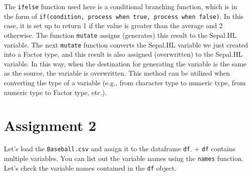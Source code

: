\documentclass[
  a4paper,
]{book}
\begin{document}
The \texttt{ifelse} function used here is a conditional branching
function, which is in the form of
\texttt{if(condition,\ process\ when\ true,\ process\ when\ false)}. In
this case, it is set up to return 1 if the value is greater than the
average and 2 otherwise. The function \texttt{mutate} assigns
(generates) this result to the Sepal.HL variable. The next
\texttt{mutate} function converts the Sepal.HL variable we just created
into a Factor type, and this result is also assigned (overwritten) to
the Sepal.HL variable. In this way, when the destination for generating
the variable is the same as the source, the variable is overwritten.
This method can be utilized when converting the type of a variable
(e.g., from character type to numeric type, from numeric type to Factor
type, etc.).

\section{Assignment 2}\label{assignment-2}

Let's load the \texttt{Baseball.csv} and assign it to the dataframe
\texttt{df}. + \texttt{df} contains multiple variables. You can list out
the variable names using the \texttt{names} function. Let's check the
variable names contained in the \texttt{df} object.
\end{document}
